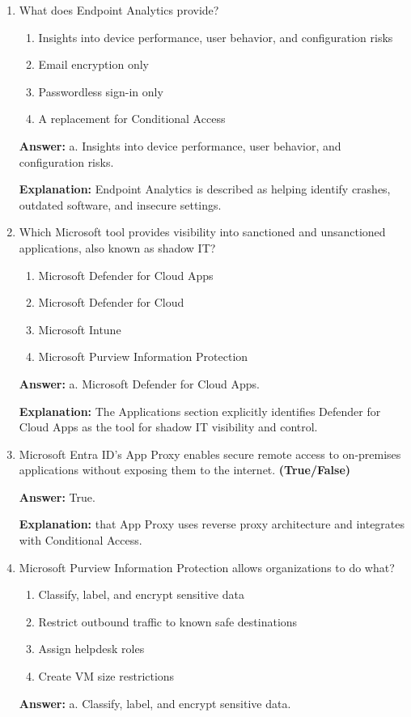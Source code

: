 \documentclass[10pt]{article}
\begin{document}
\begin{enumerate}[leftmargin=*]
\textbf{Explanation:} This is the specific example used in the Intune section.

\item What does Endpoint Analytics provide?
\begin{enumerate}[label=\alph*., leftmargin=1.5em]
\item Insights into device performance, user behavior, and configuration risks
\item Email encryption only
\item Passwordless sign-in only
\item A replacement for Conditional Access
\end{enumerate}
\textbf{Answer:} a. Insights into device performance, user behavior, and configuration risks.

\textbf{Explanation:} Endpoint Analytics is described as helping identify crashes, outdated software, and insecure settings.

\item Which Microsoft tool provides visibility into sanctioned and unsanctioned applications, also known as shadow IT?
\begin{enumerate}[label=\alph*., leftmargin=1.5em]
\item Microsoft Defender for Cloud Apps
\item Microsoft Defender for Cloud
\item Microsoft Intune
\item Microsoft Purview Information Protection
\end{enumerate}
\textbf{Answer:} a. Microsoft Defender for Cloud Apps.

\textbf{Explanation:} The Applications section explicitly identifies Defender for Cloud Apps as the tool for shadow IT visibility and control.

\item Microsoft Entra ID’s App Proxy enables secure remote access to on-premises applications without exposing them to the internet. \textbf{(True/False)}

\textbf{Answer:} True.

\textbf{Explanation:} that App Proxy uses reverse proxy architecture and integrates with Conditional Access.

\item Microsoft Purview Information Protection allows organizations to do what?
\begin{enumerate}[label=\alph*., leftmargin=1.5em]
\item Classify, label, and encrypt sensitive data
\item Restrict outbound traffic to known safe destinations
\item Assign helpdesk roles
\item Create VM size restrictions
\end{enumerate}
\textbf{Answer:} a. Classify, label, and encrypt sensitive data.


\end{enumerate}
\end{document}
